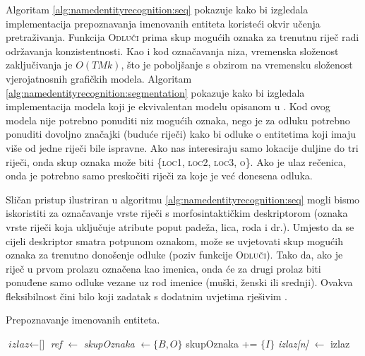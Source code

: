 Algoritam \ref{alg:namedentityrecognition:seq} pokazuje kako bi izgledala
implementacija prepoznavanja imenovanih entiteta koristeći okvir učenja
pretraživanja. Funkcija \textsc{Odluči} prima skup mogućih oznaka za trenutnu
riječ radi održavanja konzistentnosti. Kao i kod označavanja niza, vremenska
složenost zaključivanja je $O(T M k)$, što je poboljšanje s obzirom na vremensku
složenost vjerojatnosnih grafičkih modela. Algoritam
\ref{alg:namedentityrecognition:segmentation} pokazuje kako bi izgledala
implementacija modela koji je ekvivalentan modelu opisanom u
\citep{sarawagi2004semi}. Kod ovog modela nije potrebno ponuditi niz mogućih
oznaka, nego je za odluku potrebno ponuditi dovoljno značajki (buduće riječi)
kako bi odluke o entitetima koji imaju više od jedne riječi bile ispravne. Ako
nas interesiraju samo lokacije duljine do tri riječi, onda skup oznaka može biti
\{\textsc{loc1}, \textsc{loc2}, \textsc{loc3}, \textsc{o}\}. Ako je ulaz
rečenica, onda je potrebno samo preskočiti riječi za koje je već donesena
odluka.

Sličan pristup ilustriran u algoritmu \ref{alg:namedentityrecognition:seq} mogli
bismo iskoristiti za označavanje vrste riječi s morfosintaktičkim deskriptorom
(oznaka vrste riječi koja uključuje atribute poput padeža, lica, roda i dr.).
Umjesto da se cijeli deskriptor smatra potpunom oznakom, može se uvjetovati skup
mogućih oznaka za trenutno donošenje odluke (poziv funkcije \textsc{Odluči}).
Tako da, ako je riječ u prvom prolazu označena kao imenica, onda će za
drugi prolaz biti ponuđene samo odluke vezane uz rod imenice (muški, ženski
ili srednji). Ovakva fleksibilnost čini bilo koji zadatak s dodatnim uvjetima
 rješivim \citep{chang2012structured}.

\begin{algorithm}[H]
\caption{Prepoznavanje imenovanih entiteta.}
\label{alg:namedentityrecognition:seq}
\begin{algorithmic}[1]
\State $\textit{izlaz} \gets \text{[]}$
  \State \textit{ref} $\gets$ 
  \State \textit{skupOznaka} $\gets \{B,O\}$
    \State skupOznaka += $\{I\}$
  \EndIf
  \State \textit{izlaz[n]} $\gets$ 
\EndFor
\State {}
\Return izlaz
\EndFunction
\end{algorithmic}
\end{algorithm}

